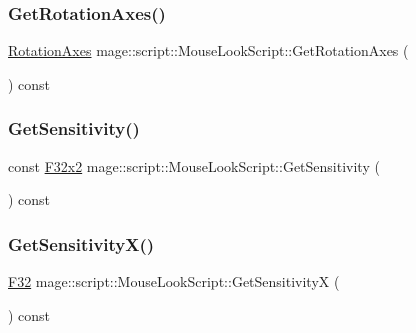 \subsubsection{\texorpdfstring{Get\+Rotation\+Axes()}{GetRotationAxes()}}
{\footnotesize\ttfamily \mbox{\hyperlink{classmage_1_1script_1_1_mouse_look_script_a662018db64c5dc84a958eb1c6123a829}{Rotation\+Axes}} mage\+::script\+::\+Mouse\+Look\+Script\+::\+Get\+Rotation\+Axes (\begin{DoxyParamCaption}{ }\end{DoxyParamCaption}) const\hspace{0.3cm}{\ttfamily [noexcept]}}

\mbox{\label{classmage_1_1script_1_1_mouse_look_script_aba0ebcfb2085d74ee7d6b388d4b0b239}} 
\subsubsection{\texorpdfstring{Get\+Sensitivity()}{GetSensitivity()}}
{\footnotesize\ttfamily const \mbox{\hyperlink{namespacemage_aee4759dedc8def6c6dec26b5c7eddf29}{F32x2}} mage\+::script\+::\+Mouse\+Look\+Script\+::\+Get\+Sensitivity (\begin{DoxyParamCaption}{ }\end{DoxyParamCaption}) const\hspace{0.3cm}{\ttfamily [noexcept]}}

\mbox{\label{classmage_1_1script_1_1_mouse_look_script_a86ee9593f0221bfa259f5ae5dd6edb30}} 
\subsubsection{\texorpdfstring{Get\+Sensitivity\+X()}{GetSensitivityX()}}
{\footnotesize\ttfamily \mbox{\hyperlink{namespacemage_aa97e833b45f06d60a0a9c4fc22ae02c0}{F32}} mage\+::script\+::\+Mouse\+Look\+Script\+::\+Get\+SensitivityX (\begin{DoxyParamCaption}{ }\end{DoxyParamCaption}) const\hspace{0.3cm}{\ttfamily [noexcept]}}

